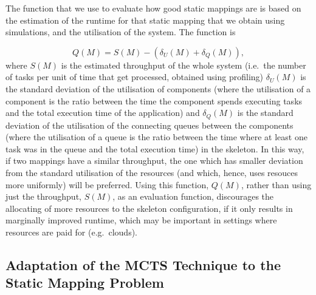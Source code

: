 \documentclass[smallextended]{svjour3}
\begin{document}


The function that we use to evaluate how good static
mappings are is based on the estimation of the runtime for that static
mapping that we obtain using simulations, and the utilisation of the
system. The function is


$$Q(M) = S(M) - (\delta_U(M) + \delta_Q(M)),$$
where $S(M)$ is the estimated throughput of the whole system (i.e.\
the number of tasks per unit of time that get processed, obtained using profiling)
$\delta_U(M)$ is the standard deviation of the utilisation of
components (where the utilisation of a component is the ratio between the time the component spends
executing tasks and the total execution time of the application) and $\delta_Q(M)$ is the standard deviation of
the utilisation of the connecting queues between the components (where
the utilisation of a queue is the ratio between the time where at least
one task was in the queue and the total execution time) in the
skeleton. In this way, if two mappings have a similar throughput, the
one which has smaller deviation from the standard utilisation of the
resources (and
which, hence, uses resouces more uniformly) will be preferred.
Using this function, $Q(M)$, rather than using
just the throughput, $S(M)$, as an evaluation function, discourages the allocating of more resources to the skeleton configuration, if
it only results in marginally improved runtime, which may be important
in settings where resources are paid for (e.g.\ clouds).

\subsection{Adaptation of the MCTS Technique to the Static Mapping
  Problem}
\end{document}
